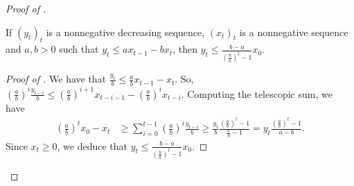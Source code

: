 \begin{proof}[Proof of ]
\begin{lemma}
    \label{lemma:bound_seq}
    If $(y_t)_t$ is a nonnegative decreasing sequence, $(x_t)_t$ is a nonnegative sequence and
    $a, b > 0$ such that $y_t \leq a x_{t-1} - b x_t$, then
    $y_t \leq \frac{b-a}{\left( \frac{b}{a} \right)^t - 1} x_0$.
\end{lemma}
\begin{proof}[Proof of ]
We have that $\frac{y_t}{b} \leq \frac{a}{b} x_{t-1} - x_t$. So,
$\left( \frac{a}{b} \right)^i \frac{y_{t-i}}{b} \leq
\left(\frac{a}{b} \right)^{i+1} x_{t-i-1} - \left( \frac{a}{b} \right)^i x_{t-i}$.
Computing the telescopic sum, we have
\begin{align*}
    \left( \frac{a}{b} \right)^t x_0 - x_t &\geq
    \sum_{i=0}^{t-1} \left( \frac{a}{b} \right)^i \frac{y_{t-i}}{b}
    \geq \frac{y_t}{b} \frac{\left( \frac{a}{b} \right)^t - 1}{\frac{a}{b} - 1}
    = y_t \frac{\left( \frac{a}{b} \right)^t - 1}{a - b}.
\end{align*}
Since $x_t \geq 0$, we deduce that
$y_t \leq \frac{b-a}{\left( \frac{b}{a} \right)^t - 1} x_0$.
\end{proof}


\end{proof}
